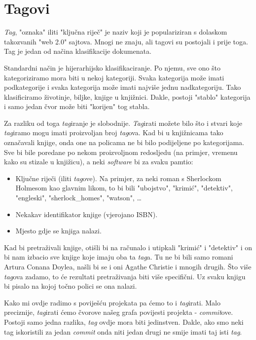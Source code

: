\chapter*{Tagovi}

\emph{Tag}, "oznaka" iliti "ključna riječ" je naziv koji je populariziran s dolaskom takozvanih "web 2.0" sajtova. 
Mnogi ne znaju, ali tagovi su postojali i prije toga. 
Tag je jedan od načina klasifikacije dokumenata.

Standardni način je hijerarhijsko klasifikaciranje.
Po njemu, sve ono što kategoriziramo mora biti u nekoj kategoriji.
Svaka kategorija može imati podkategorije i svaka kategorija može imati najviše jednu nadkategoriju.
Tako klasificiramo životinje, biljke, knjige u knjižnici.
Dakle, postoji "stablo" kategorija i samo jedan čvor može biti "korijen" tog stabla.

Za razliku od toga \emph{tag}iranje je slobodnije.
\emph{Tag}irati možete bilo što i stvari koje \emph{tag}iramo mogu imati proizvoljan broj \emph{tag}ova.
Kad bi u knjižnicama tako označavali knjige, onda one na policama ne bi bilo podijeljene po kategorijama.
Sve bi bile poredane po nekom proizvoljnom redosljedu (na primjer, vremenu kako su stizale u knjižicu), a neki \emph{software} bi za svaku pamtio:

\begin{itemize}
	\item Ključne riječi (iliti \emph{tag}ove). Na primjer, za neki roman s Sherlockom Holmesom kao glavnim likom, to bi bili "ubojstvo", "krimić", "detektiv", "engleski", "sherlock\_homes", "watson", \dots
	\item Nekakav identifikator knjige (vjerojano ISBN).
	\item Mjesto gdje se knjiga nalazi.
\end{itemize}

Kad bi pretraživali knjige, otišli bi na računalo i utipkali "krimić" i "detektiv" i on bi nam izbacio sve knjige koje imaju oba ta \emph{tag}a.
Tu ne bi bili samo romani Artura Conana Doylea, našli bi se i oni Agathe Christie i mnogih drugih. 
Što više \emph{tag}ova zadamo, to će rezultati pretraživanja biti više specifični.
Uz svaku knjigu bi pisalo na kojoj točno polici se ona nalazi.

Kako mi ovdje radimo s poviješću projekata pa ćemo to i \emph{tag}irati.
Malo preciznije, \emph{tag}irati ćemo čvorove našeg grafa povijesti projekta - \emph{commit}ove.
Postoji samo jedna razlika, \emph{tag} ovdje mora biti jedinstven.
Dakle, ako smo neki tag iskoristili za jedan \emph{commit} onda niti jedan drugi ne smije imati taj isti \emph{tag}.

